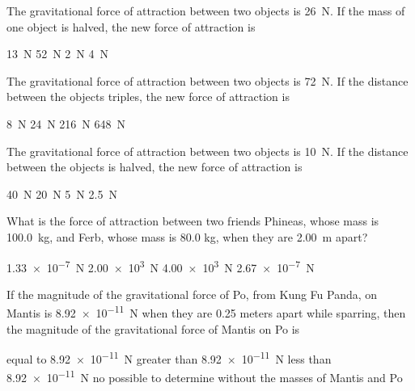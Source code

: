 \documentclass[../main-physics-problems.tex]{subfiles}
\begin{document}
\begin{questions}
\question
The gravitational force of attraction between two objects is \SI{26}{N}. If the mass of one object is halved, the new force of attraction is

\begin{randomizechoices}
    \correctchoice \SI{13}{N}
    \choice \SI{52}{N}
    \choice \SI{2}{N}
    \choice \SI{4}{N}
\end{randomizechoices}

\question
The gravitational force of attraction between two objects is \SI{72}{N}. If the distance between the objects triples, the new force of attraction is

\begin{randomizechoices}
    \correctchoice \SI{8}{N}
    \choice \SI{24}{N}
    \choice \SI{216}{N}
    \choice \SI{648}{N}
\end{randomizechoices}

\question
The gravitational force of attraction between two objects is \SI{10}{N}. If the distance between the objects is halved, the new force of attraction is

\begin{randomizechoices}
    \correctchoice \SI{40}{N}
    \choice \SI{20}{N}
    \choice \SI{5}{N}
    \choice \SI{2.5}{N}
\end{randomizechoices}

\question
What is the force of attraction between two friends Phineas, whose mass is \SI{100.0}{kg}, and Ferb, whose mass is 80.0 kg, when they are \SI{2.00}{m} apart? 

\begin{randomizechoices}
    \correctchoice \SI{1.33e-7}{N}
    \choice \SI{2.00e3}{N}
    \choice \SI{4.00e3}{N}
    \choice \SI{2.67e-7}{N}
\end{randomizechoices}

\question
If the magnitude of the gravitational force of Po, from Kung Fu Panda, on Mantis is \SI{8.92e-11}{N} when they are 0.25 meters apart while sparring, then the magnitude of the gravitational force of Mantis on Po is

\begin{randomizechoices}[keeplast]
    \correctchoice equal to \SI{8.92e-11}{N}
    \choice greater than \SI{8.92e-11}{N}
    \choice less than \SI{8.92e-11}{N}
    \choice no possible to determine without the masses of Mantis and Po
\end{randomizechoices}    
\end{questions}


\clearpage
\end{document}
